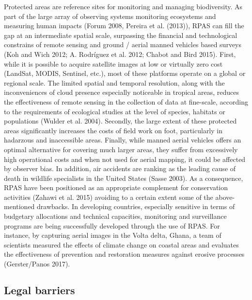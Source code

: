 \documentclass[]{interact}
\theoremstyle{plain}%
\theoremstyle{definition}
\theoremstyle{remark}
\begin{document}
Protected areas are reference sites for monitoring and managing
biodiversity. As part of the large array of observing systems monitoring
ecosystems and measuring human impacts (Forum 2008, Pereira et al.
(2013)), RPAS can fill the gap at an intermediate spatial scale,
surpassing the financial and technological constrains of remote sensing
and ground / aerial manned vehicles based surveys (Koh and Wich 2012; A.
Rodríguez et al. 2012; Chabot and Bird 2015). First, while it is
possible to acquire satellite images at low or virtually zero cost
(LandSat, MODIS, Sentinel, etc.), most of these platforms operate on a
global or regional scale. The limited spatial and temporal resolution,
along with the inconveniences of cloud presence especially noticeable in
tropical areas, reduces the effectiveness of remote sensing in the
collection of data at fine-scale, according to the requirements of
ecological studies at the level of species, habitats or populations
(Wulder et al. 2004). Secondly, the large extent of these protected
areas significantly increases the costs of field work on foot,
particularly in hadarzous and inaccessible areas. Finally, while manned
aerial vehicles offers an optimal alternative for covering much larger
areas, they suffer from excessively high operational costs and when not
used for aerial mapping, it could be affected by observer bias. In
addition, air accidents are ranking as the leading cause of death in
wildlife specialists in the United States (Sasse 2003). As a
consequence, RPAS have been positioned as an appropriate complement for
conservation activities (Zahawi et al. 2015) avoiding to a certain
extent some of the above-mentioned drawbacks. In developing countries,
especially sensitive in terms of budgetary allocations and technical
capacities, monitoring and surveillance programs are being successfully
developed through the use of RPAS. For instance, by capturing aerial
images in the Volta delta, Ghana, a team of scientists measured the
effects of climate change on coastal areas and evaluates the
effectiveness of prevention and restoration measures against erosive
processes (Gerster/Panos 2017).

\subsection{Legal barriers}\label{legal-barriers}
\end{document}

